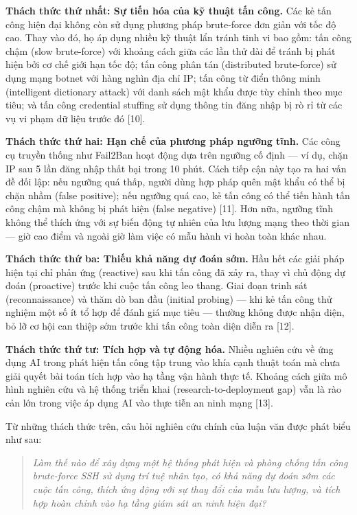 \documentclass[
  a4paper]{report}
\begin{document}
\textbf{Thách thức thứ nhất: Sự tiến hóa của kỹ thuật tấn công.} Các kẻ
tấn công hiện đại không còn sử dụng phương pháp brute-force đơn giản với
tốc độ cao. Thay vào đó, họ áp dụng nhiều kỹ thuật lẩn tránh tinh vi bao
gồm: tấn công chậm (slow brute-force) với khoảng cách giữa các lần thử
dài để tránh bị phát hiện bởi cơ chế giới hạn tốc độ; tấn công phân tán
(distributed brute-force) sử dụng mạng botnet với hàng nghìn địa chỉ IP;
tấn công từ điển thông minh (intelligent dictionary attack) với danh
sách mật khẩu được tùy chỉnh theo mục tiêu; và tấn công credential
stuffing sử dụng thông tin đăng nhập bị rò rỉ từ các vụ vi phạm dữ liệu
trước đó {[}10{]}.

\textbf{Thách thức thứ hai: Hạn chế của phương pháp ngưỡng tĩnh.} Các
công cụ truyền thống như Fail2Ban hoạt động dựa trên ngưỡng cố định ---
ví dụ, chặn IP sau 5 lần đăng nhập thất bại trong 10 phút. Cách tiếp cận
này tạo ra hai vấn đề đối lập: nếu ngưỡng quá thấp, người dùng hợp pháp
quên mật khẩu có thể bị chặn nhầm (false positive); nếu ngưỡng quá cao,
kẻ tấn công có thể tiến hành tấn công chậm mà không bị phát hiện (false
negative) {[}11{]}. Hơn nữa, ngưỡng tĩnh không thể thích ứng với sự biến
động tự nhiên của lưu lượng mạng theo thời gian --- giờ cao điểm và
ngoài giờ làm việc có mẫu hành vi hoàn toàn khác nhau.

\textbf{Thách thức thứ ba: Thiếu khả năng dự đoán sớm.} Hầu hết các giải
pháp hiện tại chỉ phản ứng (reactive) sau khi tấn công đã xảy ra, thay
vì chủ động dự đoán (proactive) trước khi cuộc tấn công leo thang. Giai
đoạn trinh sát (reconnaissance) và thăm dò ban đầu (initial probing) ---
khi kẻ tấn công thử nghiệm một số ít tổ hợp để đánh giá mục tiêu ---
thường không được nhận diện, bỏ lỡ cơ hội can thiệp sớm trước khi tấn
công toàn diện diễn ra {[}12{]}.

\textbf{Thách thức thứ tư: Tích hợp và tự động hóa.} Nhiều nghiên cứu về
ứng dụng AI trong phát hiện tấn công tập trung vào khía cạnh thuật toán
mà chưa giải quyết bài toán tích hợp vào hạ tầng vận hành thực tế.
Khoảng cách giữa mô hình nghiên cứu và hệ thống triển khai
(research-to-deployment gap) vẫn là rào cản lớn trong việc áp dụng AI
vào thực tiễn an ninh mạng {[}13{]}.

Từ những thách thức trên, câu hỏi nghiên cứu chính của luận văn được
phát biểu như sau:

\begin{quote}
\emph{Làm thế nào để xây dựng một hệ thống phát hiện và phòng chống tấn
công brute-force SSH sử dụng trí tuệ nhân tạo, có khả năng dự đoán sớm
các cuộc tấn công, thích ứng động với sự thay đổi của mẫu lưu lượng, và
tích hợp hoàn chỉnh vào hạ tầng giám sát an ninh hiện đại?}
\end{quote}
\end{document}
